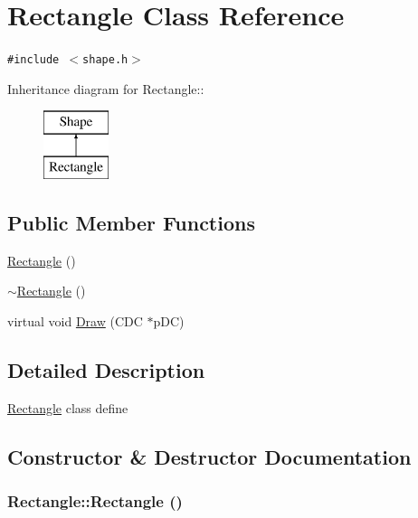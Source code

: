 \hypertarget{classRectangle}{
\section{Rectangle Class Reference}
\label{classRectangle}
}
{\tt \#include $<$shape.h$>$}

Inheritance diagram for Rectangle::\begin{figure}[H]
\begin{center}
\leavevmode
\includegraphics[height=2cm]{classRectangle}
\end{center}
\end{figure}
\subsection*{Public Member Functions}
\begin{CompactItemize}
\item 
\hyperlink{classRectangle_8a933e0ebd9e80ce91e61ffe87fd577e}{Rectangle} ()
\item 
\hyperlink{classRectangle_494c076b13aadf26efdce07d23c61ddd}{$\sim$Rectangle} ()
\item 
virtual void \hyperlink{classRectangle_22e5e5f9e3c7474d3586e1d7d36bb069}{Draw} (CDC $\ast$pDC)
\end{CompactItemize}


\subsection{Detailed Description}
\hyperlink{classRectangle}{Rectangle} class define 

\subsection{Constructor \& Destructor Documentation}
\hypertarget{classRectangle_8a933e0ebd9e80ce91e61ffe87fd577e}{
\subsubsection[Rectangle]{\setlength{\rightskip}{0pt plus 5cm}Rectangle::Rectangle ()}}
\label{classRectangle_8a933e0ebd9e80ce91e61ffe87fd577e}


